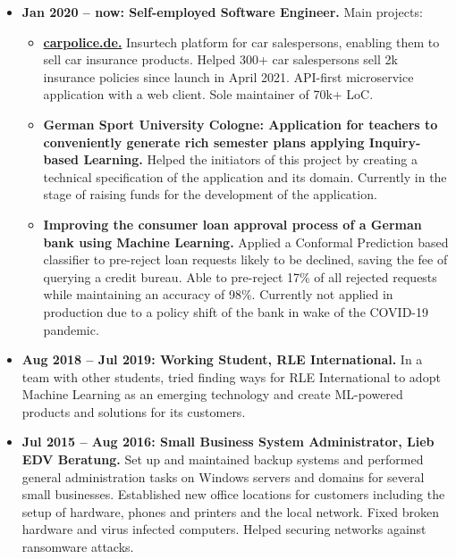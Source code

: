 \documentclass[10pt]{article}
\begin{document}
\begin{itemize}[label={}, leftmargin=*]

\item \textbf{Jan 2020 -- now: Self-employed Software Engineer.} Main
  projects:

  \begin{itemize}[label={}, leftmargin=*]
    \item \textbf{\href{https://carpolice.de}{carpolice.de.}}
      Insurtech platform for car salespersons, enabling them to sell
      car insurance products.
      Helped 300+ car salespersons sell 2k insurance policies since
      launch in April 2021.
      API-first microservice application with a web client.
      Sole maintainer of 70k+ LoC.

    \item \textbf{German Sport University Cologne: Application for
      teachers to conveniently generate rich semester plans applying
      Inquiry-based Learning.}
      Helped the initiators of this project by creating a technical
      specification of the application and its domain.
      Currently in the stage of raising funds for the development of
      the application.

    \item \textbf{Improving the consumer loan approval process of a
      German bank using Machine Learning.}
      Applied a Conformal Prediction based classifier to pre-reject
      loan requests likely to be declined, saving the fee of querying
      a credit bureau.
      Able to pre-reject 17\% of all rejected requests while
      maintaining an accuracy of 98\%.
      Currently not applied in production due to a policy shift of the
      bank in wake of the COVID-19 pandemic.
  \end{itemize}

\item \textbf{Aug 2018 -- Jul 2019: Working Student, RLE International.}
In a team with other students, tried finding ways for RLE
International to adopt Machine Learning as an emerging technology and
create ML-powered products and solutions for its customers.

\item \textbf{Jul 2015 -- Aug 2016: Small Business System Administrator,
Lieb EDV Beratung.}
Set up and maintained backup systems and performed general
administration tasks on Windows servers and domains for several small
businesses.
Established new office locations for customers including the setup of
hardware, phones and printers and the local network.
Fixed broken hardware and virus infected computers.
Helped securing networks against ransomware attacks.

\end{itemize}
\end{document}
